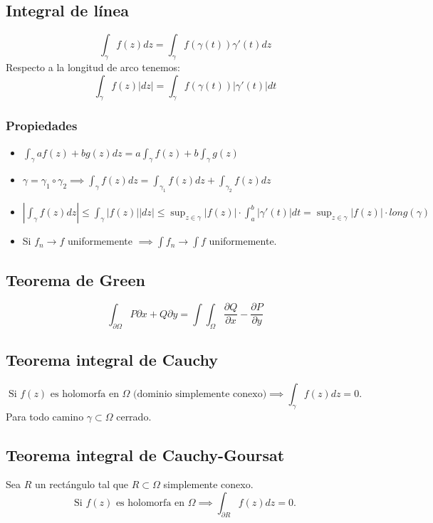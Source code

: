 \documentclass[paper=a4, fontsize=11pt]{scrartcl}
\numberwithin{equation}{section}
\numberwithin{figure}{section}
\numberwithin{table}{section}
\begin{document}
\subsection{Integral de línea}
$$\int_\gamma f(z)dz = \int_\gamma f(\gamma(t))\gamma'(t)dz$$
Respecto a la longitud de arco tenemos:
$$\int_\gamma f(z)|dz| = \int_\gamma f(\gamma(t))|\gamma'(t)|dt$$
\subsubsection{Propiedades}
\begin{itemize}
\item $\int_\gamma af(z)+bg(z)dz = a\int_\gamma f(z) + b\int_\gamma g(z)$
\item $\gamma = \gamma_1 \circ \gamma_2 \implies \int_\gamma f(z)dz = \int_{\gamma_1} f(z)dz + \int_{\gamma_2} f(z)dz$
\item $\boxed{\left|\int_\gamma f(z)dz\right| \le \int_\gamma |f(z)||dz| \le \sup_{z\in\gamma}\left|f(z)\right|\cdot \int_a^b|\gamma'(t)|dt = \sup_{z\in\gamma}\left|f(z)\right|\cdot long(\gamma)}$
\item Si ${f_n}\to f$ uniformemente $\implies \int f_n \to \int f$ uniformemente.
\end{itemize}

\subsection{Teorema de Green}
$$\int_{\partial\Omega} P \partial x+Q\partial y = \int\int_\Omega \frac{\partial Q}{\partial x} - \frac{\partial P}{\partial y} $$

\subsection{Teorema integral de Cauchy}
$$\text{Si }f(z)\text{ es holomorfa en }\Omega\text{ (dominio simplemente conexo)} \implies \int_{\gamma} f(z)dz = 0.$$ Para todo camino $\gamma\subset\Omega$ cerrado.

\subsection{Teorema integral de Cauchy-Goursat}
Sea $R$ un rectángulo tal que $R\subset\Omega$ simplemente conexo.
$$\text{Si }f(z)\text{ es holomorfa en }\Omega \implies \int_{\partial R} f(z)dz = 0.$$
\end{document}
